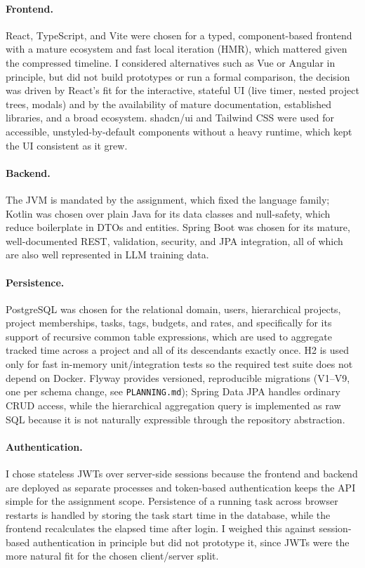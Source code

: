 \documentclass[11pt,a4paper]{article}
\begin{document}
\paragraph{Frontend.} React, TypeScript, and Vite were chosen for a typed, component-based frontend with a mature ecosystem and fast local iteration (HMR), which mattered given the compressed timeline. I considered alternatives such as Vue or Angular in principle, but did not build prototypes or run a formal comparison, the decision was driven by React's fit for the interactive, stateful UI (live timer, nested project trees, modals) and by the availability of mature documentation, established libraries, and a broad ecosystem. shadcn/ui and Tailwind CSS were used for accessible, unstyled-by-default components without a heavy runtime, which kept the UI consistent as it grew.

\paragraph{Backend.} The JVM is mandated by the assignment, which fixed the language family; Kotlin was chosen over plain Java for its data classes and null-safety, which reduce boilerplate in DTOs and entities. Spring Boot was chosen for its mature, well-documented REST, validation, security, and JPA integration, all of which are also well represented in LLM training data.

\paragraph{Persistence.} PostgreSQL was chosen for the relational domain, users, hierarchical projects, project memberships, tasks, tags, budgets, and rates, and specifically for its support of recursive common table expressions, which are used to aggregate tracked time across a project and all of its descendants exactly once. H2 is used only for fast in-memory unit/integration tests so the required test suite does not depend on Docker. Flyway provides versioned, reproducible migrations (V1--V9, one per schema change, see \texttt{PLANNING.md}); Spring Data JPA handles ordinary CRUD access, while the hierarchical aggregation query is implemented as raw SQL because it is not naturally expressible through the repository abstraction.

\paragraph{Authentication.} I chose stateless JWTs over server-side sessions because the frontend and backend are deployed as separate processes and token-based authentication keeps the API simple for the assignment scope. Persistence of a running task across browser restarts is handled by storing the task start time in the database, while the frontend recalculates the elapsed time after login. I weighed this against session-based authentication in principle but did not prototype it, since JWTs were the more natural fit for the chosen client/server split.
\end{document}
